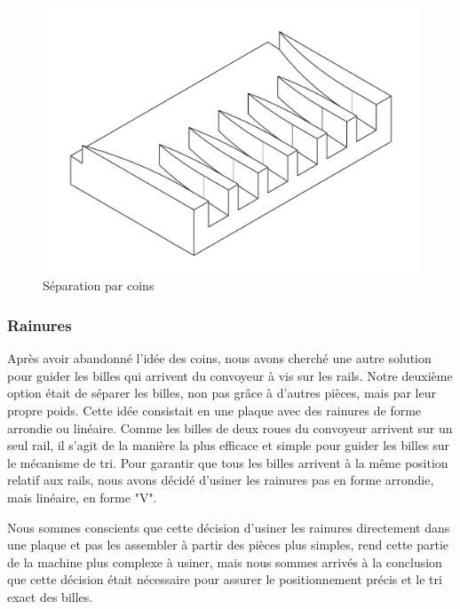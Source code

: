 \begin{figure}
    \centering
    \includegraphics[width=\textwidth]{Graphics/Rails/COINS.pdf}
    \caption{Séparation par coins}
\end{figure}

\subsubsection{Rainures}
Après avoir abandonné l'idée des coins, nous avons cherché une autre solution pour guider les billes qui arrivent du convoyeur à vis sur les rails. Notre deuxième option était de séparer les billes, non pas grâce à d'autres pièces, mais par leur propre poids. Cette idée consistait en une plaque avec des rainures de forme arrondie ou linéaire. Comme les billes de deux roues du convoyeur arrivent sur un seul rail, il s'agit de la manière la plus efficace et simple pour guider les billes sur le mécanisme de tri. Pour garantir que tous les billes arrivent à la même position relatif aux rails, nous avons décidé d'usiner les rainures pas en forme arrondie, mais linéaire, en forme "V".

Nous sommes conscients que cette décision d'usiner les rainures directement dans une plaque et pas les assembler à partir des pièces plus simples, rend cette partie de la machine plus complexe à usiner, mais nous sommes arrivés à la conclusion que cette décision était nécessaire pour assurer le positionnement précis et le tri exact des billes.


